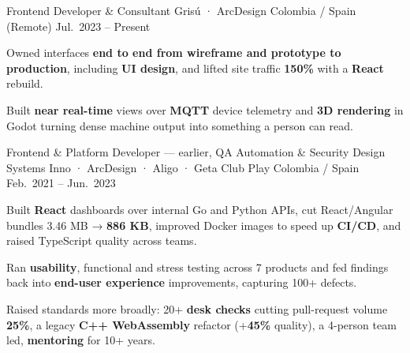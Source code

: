 \begin{cventries}
  \cventry
  {Frontend Developer \& Consultant}
  {Grisú · ArcDesign}
  {Colombia / Spain (Remote)}
  {Jul.\ 2023 -- Present}
  {
    \begin{cvitems}
      \item {Owned interfaces \textbf{end to end from wireframe and prototype to production}, including \textbf{UI design}, and lifted site traffic \textbf{150\%} with a \textbf{React} rebuild.}
      \item {Built \textbf{near real-time} views over \textbf{MQTT} device telemetry and \textbf{3D rendering} in Godot turning dense machine output into something a person can read.}
    \end{cvitems}
  }

  \cventry
  {Frontend \& Platform Developer --- earlier, QA Automation \& Security}
  {Design Systems Inno · ArcDesign · Aligo · Geta Club Play}
  {Colombia / Spain}
  {Feb.\ 2021 -- Jun.\ 2023}
  {
    \begin{cvitems}
      \item {Built \textbf{React} dashboards over internal Go and Python APIs, cut React/Angular bundles 3.46 MB → \textbf{886 KB}, improved Docker images to speed up \textbf{CI/CD}, and raised TypeScript quality across teams.}
      \item {Ran \textbf{usability}, functional and stress testing across 7 products and fed findings back into \textbf{end-user experience} improvements, capturing 100+ defects.}
      \item {Raised standards more broadly: 20+ \textbf{desk checks} cutting pull-request volume \textbf{25\%}, a legacy \textbf{C++ WebAssembly} refactor (+\textbf{45\%} quality), a 4-person team led, \textbf{mentoring} for 10+ years.}
    \end{cvitems}
  }

\end{cventries}
